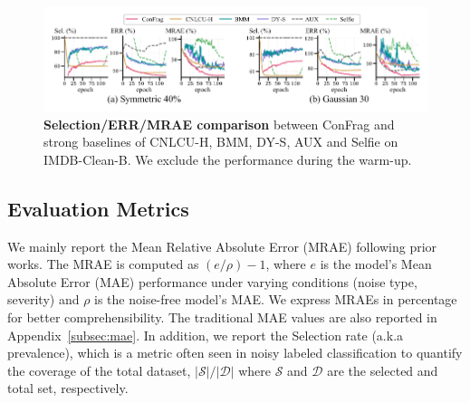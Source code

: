 \documentclass{article}
\theoremstyle{plain}
\theoremstyle{definition}
\theoremstyle{remark}
\begin{document}
\begin{figure}[t]
\begin{center}
\centerline{\includegraphics[width=\textwidth]{imgs/selerr_comparison_neurips.pdf}}
\vskip -0.1in
\caption{\textbf{Selection/ERR/MRAE comparison}
between ConFrag and strong baselines of CNLCU-H, BMM, DY-S, AUX and Selfie on IMDB-Clean-B. We exclude the performance during the warm-up. %
}
\label{fig:hse}
\end{center}
\vskip -0.25in
\end{figure}

\subsection{Evaluation Metrics}\label{subsec:evaluation_metrics}
We mainly report the Mean Relative Absolute Error (MRAE) following prior works. 
The MRAE is computed as $(e/\rho)-1$, where $e$ is the model's Mean Absolute Error (MAE) performance under varying conditions (noise type, severity) and $\rho$ is the noise-free model's MAE. %
We express MRAEs in percentage for better comprehensibility. 
The traditional MAE values are also reported in Appendix~\ref{subsec:mae}.
In addition, we report the Selection rate (a.k.a prevalence), which is a metric often seen in noisy labeled classification to quantify the coverage of the total dataset, $|\mathcal{S}|/|\mathcal{D}|$ where $\mathcal{S}$ and $\mathcal{D}$ are the selected and total set, respectively. %
\end{document}
